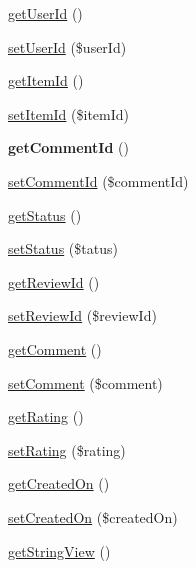 \begin{DoxyCompactItemize}
\item 
\hyperlink{class_review_a05f6aa1ffae6295260d9f1cca016bf33}{get\+User\+Id} ()
\item 
\hyperlink{class_review_aad3264e2196ea03403e62460cd62ff96}{set\+User\+Id} (\$user\+Id)
\item 
\hyperlink{class_review_a5b01110117f0cd71a5a115dc8b9eab6f}{get\+Item\+Id} ()
\item 
\hyperlink{class_review_a22de7a673c95892b16b497788139add1}{set\+Item\+Id} (\$item\+Id)
\item 
\hypertarget{class_review_aeeb8d5147e17f9279f3aadd016383861}{{\bfseries get\+Comment\+Id} ()}\label{class_review_aeeb8d5147e17f9279f3aadd016383861}

\item 
\hyperlink{class_review_ab1357beaf9d27129c7d766ff66e0d6b8}{set\+Comment\+Id} (\$comment\+Id)
\item 
\hyperlink{class_review_a9d21636071f529e2154051d3ea6e5921}{get\+Status} ()
\item 
\hyperlink{class_review_afeb58bbf45f3571f34d5046f1b7bf827}{set\+Status} (\$tatus)
\item 
\hyperlink{class_review_ad7d76fed59573da85882409bdfb81a6d}{get\+Review\+Id} ()
\item 
\hyperlink{class_review_aa0f3bdfbc68d77b40c69fd257368fad7}{set\+Review\+Id} (\$review\+Id)
\item 
\hyperlink{class_review_adb57c3d1b74c19589ba1d641ea1a390e}{get\+Comment} ()
\item 
\hyperlink{class_review_a169d67ad53abdd4e6d1cd931fe15e839}{set\+Comment} (\$comment)
\item 
\hyperlink{class_review_a209cc2a79146f673389564ea1315c2a2}{get\+Rating} ()
\item 
\hyperlink{class_review_a0bda8a5142a1c40476109d41ffac7fa6}{set\+Rating} (\$rating)
\item 
\hyperlink{class_review_a346b90b05b25684ab3d2c62566270551}{get\+Created\+On} ()
\item 
\hyperlink{class_review_adff89ef96f7c1e0f0752caca8ccc750b}{set\+Created\+On} (\$created\+On)
\item 
\hyperlink{class_review_a4d5198c3929ebdaa2e71d41bb529d70b}{get\+String\+View} ()
\end{DoxyCompactItemize}
